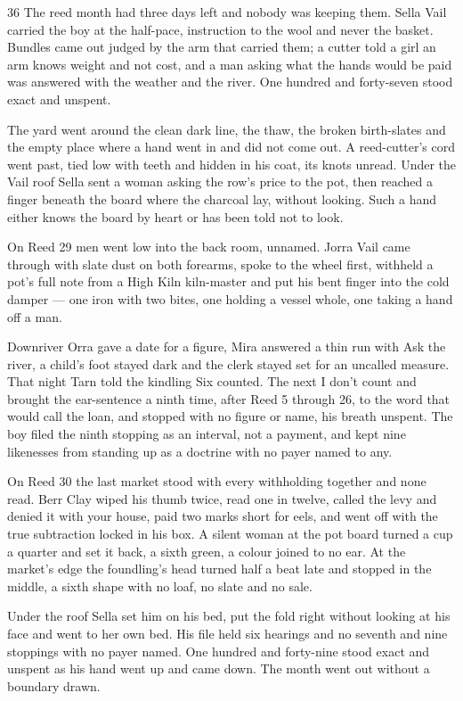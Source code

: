 \begin{CRchronicle}{36}
The reed month had three days left and nobody was keeping them. Sella Vail carried the boy at the half-pace, instruction to the wool and never the basket. Bundles came out judged by the arm that carried them; a cutter told a girl an arm knows weight and not cost, and a man asking what the hands would be paid was answered with the weather and the river. One hundred and forty-seven stood exact and unspent.

The yard went around the clean dark line, the thaw, the broken birth-slates and the empty place where a hand went in and did not come out. A reed-cutter’s cord went past, tied low with teeth and hidden in his coat, its knots unread. Under the Vail roof Sella sent a woman asking the row’s price to the pot, then reached a finger beneath the board where the charcoal lay, without looking. Such a hand either knows the board by heart or has been told not to look.

On Reed 29 men went low into the back room, unnamed. Jorra Vail came through with slate dust on both forearms, spoke to the wheel first, withheld a pot’s full note from a High Kiln kiln-master and put his bent finger into the cold damper --- one iron with two bites, one holding a vessel whole, one taking a hand off a man.

Downriver Orra gave a date for a figure, Mira answered a thin run with Ask the river, a child’s foot stayed dark and the clerk stayed set for an uncalled measure. That night Tarn told the kindling Six counted. The next I don’t count and brought the ear-sentence a ninth time, after Reed 5 through 26, to the word that would call the loan, and stopped with no figure or name, his breath unspent. The boy filed the ninth stopping as an interval, not a payment, and kept nine likenesses from standing up as a doctrine with no payer named to any.

On Reed 30 the last market stood with every withholding together and none read. Berr Clay wiped his thumb twice, read one in twelve, called the levy and denied it with your house, paid two marks short for eels, and went off with the true subtraction locked in his box. A silent woman at the pot board turned a cup a quarter and set it back, a sixth green, a colour joined to no ear. At the market’s edge the foundling’s head turned half a beat late and stopped in the middle, a sixth shape with no loaf, no slate and no sale.

Under the roof Sella set him on his bed, put the fold right without looking at his face and went to her own bed. His file held six hearings and no seventh and nine stoppings with no payer named. One hundred and forty-nine stood exact and unspent as his hand went up and came down. The month went out without a boundary drawn.
\end{CRchronicle}
